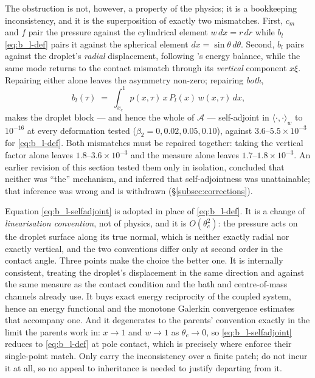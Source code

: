 The obstruction is not, however, a property of the physics; it is a bookkeeping inconsistency, and it is the superposition of exactly two mismatches. First, $c_m$ and $f$ pair the pressure against the cylindrical element $w\,dx=r\,dr$ while $b_l$ \eqref{eq:b_l-def} pairs it against the spherical element $dx=\sin\theta\,d\theta$. Second, $b_l$ pairs against the droplet's \emph{radial} displacement, following \cite{AlventosaEtAl2023}'s energy balance, while the same mode returns to the contact mismatch through its \emph{vertical} component $x\xi$. Repairing either alone leaves the asymmetry non-zero; repairing \emph{both},
\begin{equation}
    b_l(\tau) \;=\; \int_{x_c}^1 p(x,\tau)\,x\,P_l(x)\,w(x,\tau)\,dx\text{,}
    \label{eq:b_l-selfadjoint}
\end{equation}
makes the droplet block --- and hence the whole of $\mathcal A$ --- self-adjoint in $\langle\cdot,\cdot\rangle_w$ to $10^{-16}$ at every deformation tested ($\beta_2=0,0.02,0.05,0.10$), against $3.6$--$5.5\times10^{-3}$ for \eqref{eq:b_l-def}. Both mismatches must be repaired together: taking the vertical factor alone leaves $1.8$--$3.6\times10^{-3}$ and the measure alone leaves $1.7$--$1.8\times10^{-3}$. An earlier revision of this section tested them only in isolation, concluded that neither was ``the'' mechanism, and inferred that self-adjointness was unattainable; that inference was wrong and is withdrawn (\S\ref{subsec:corrections}).

Equation \eqref{eq:b_l-selfadjoint} is adopted in place of \eqref{eq:b_l-def}. It is a change of \emph{linearisation convention}, not of physics, and it is $O(\theta_c^2)$: the pressure acts on the droplet surface along its true normal, which is neither exactly radial nor exactly vertical, and the two conventions differ only at second order in the contact angle. Three points make the choice the better one. It is internally consistent, treating the droplet's displacement in the same direction and against the same measure as the contact condition and the bath and centre-of-mass channels already use. It buys exact energy reciprocity of the coupled system, hence an energy functional and the monotone Galerkin convergence estimates that accompany one. And it degenerates to the parents' convention exactly in the limit the parents work in: $x\to1$ and $w\to1$ as $\theta_c\to0$, so \eqref{eq:b_l-selfadjoint} reduces to \eqref{eq:b_l-def} at pole contact, which is precisely where \cite{AlventosaEtAl2023} enforce their single-point match. Only \cite{AgueroEtAl2026} carry the inconsistency over a finite patch; \cite{AlventosaEtAl2023} do not incur it at all, so no appeal to inheritance is needed to justify departing from it.

